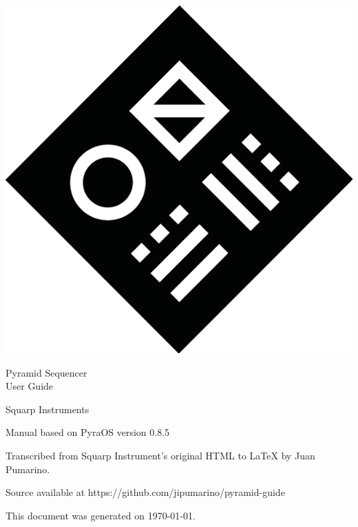 \thispagestyle{coverpagestyle}
\vspace*{\fill}
\begin{center}
\includegraphics{figs/squarplogo.png}

\fontsize{30}{30}\futurafont
Pyramid Sequencer\\
User Guide

\fontsize{18}{18}\futurafont
Squarp Instruments
\end{center}
\vspace*{\fill}

\newpage
\thispagestyle{coverpagestyle}

\vspace*{\fill}

Manual based on PyraOS version 0.8.5

Transcribed from Squarp Instrument's original HTML to \LaTeX{} by Juan Pumarino.

Source available at https://github.com/jipumarino/pyramid-guide

This document was generated on \today.

\vspace*{\fill}

\newpage
